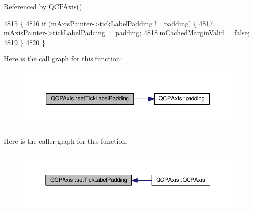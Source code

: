 Referenced by Q\+C\+P\+Axis().


\begin{DoxyCode}
4815                                              \{
4816   \textcolor{keywordflow}{if} (\hyperlink{class_q_c_p_axis_aeeae00935bd2dab82d64f32544a90913}{mAxisPainter}->\hyperlink{class_q_c_p_axis_painter_private_a264cfa080e84e536cf2d1ab9c5d5cc5f}{tickLabelPadding} != \hyperlink{class_q_c_p_axis_abb85015a9467ec176e70698307ec833a}{padding}) \{
4817     \hyperlink{class_q_c_p_axis_aeeae00935bd2dab82d64f32544a90913}{mAxisPainter}->\hyperlink{class_q_c_p_axis_painter_private_a264cfa080e84e536cf2d1ab9c5d5cc5f}{tickLabelPadding} = \hyperlink{class_q_c_p_axis_abb85015a9467ec176e70698307ec833a}{padding};
4818     \hyperlink{class_q_c_p_axis_a2cde37b6e385f47e11322df4ac1b0e9b}{mCachedMarginValid} = \textcolor{keyword}{false};
4819   \}
4820 \}
\end{DoxyCode}


Here is the call graph for this function\+:\nopagebreak
\begin{figure}[H]
\begin{center}
\leavevmode
\includegraphics[width=350pt]{class_q_c_p_axis_af302c479af9dbc2e9f0e44e07c0012ee_cgraph}
\end{center}
\end{figure}




Here is the caller graph for this function\+:\nopagebreak
\begin{figure}[H]
\begin{center}
\leavevmode
\includegraphics[width=350pt]{class_q_c_p_axis_af302c479af9dbc2e9f0e44e07c0012ee_icgraph}
\end{center}
\end{figure}


\hypertarget{class_q_c_p_axis_a1bddd4413df8a576b7ad4b067fb33375}{}
